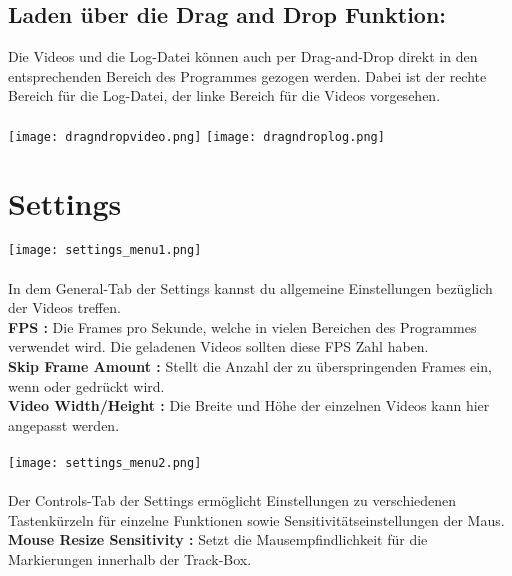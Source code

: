 \subsection{Laden über die Drag and Drop Funktion:}
Die Videos und die Log-Datei können auch per Drag-and-Drop direkt in den entsprechenden Bereich des Programmes gezogen werden. Dabei ist der rechte Bereich für die Log-Datei, der linke Bereich für die Videos vorgesehen.
\\
\vspace{5mm}
\\
\texttt{[image: dragndropvideo.png]}
\hspace{20mm}
\texttt{[image: dragndroplog.png]}\\

\section{Settings}
\texttt{[image: settings\_menu1.png]}\\
\\ 
In dem General-Tab der Settings kannst du allgemeine Einstellungen bezüglich der Videos treffen. \\
\textbf{FPS : } Die Frames pro Sekunde, welche in vielen Bereichen des Programmes verwendet wird. Die geladenen Videos sollten diese FPS Zahl haben.\\
\textbf{Skip Frame Amount : }	Stellt die Anzahl der zu überspringenden Frames ein, wenn \hspace{5mm} \ll \hspace{5mm}  oder  \hspace{5mm}   \gg \hspace{5mm}gedrückt wird. \\
\textbf{Video Width/Height : } Die Breite und Höhe der einzelnen Videos kann hier angepasst werden.
\\
\vspace{5mm}
\\
\texttt{[image: settings\_menu2.png]}\\
\\
Der Controls-Tab der Settings ermöglicht Einstellungen zu verschiedenen Tastenkürzeln für einzelne Funktionen sowie Sensitivitätseinstellungen der Maus. \\
\textbf{Mouse Resize Sensitivity : } Setzt die Mausempfindlichkeit für die Markierungen innerhalb der Track-Box.\\

